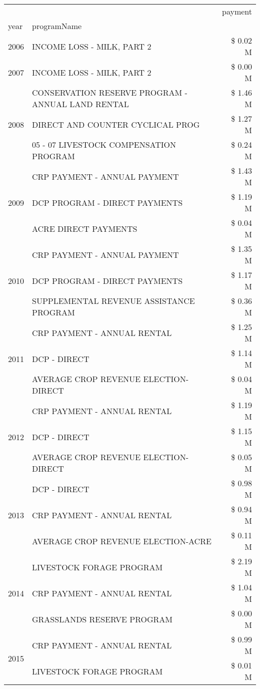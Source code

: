 \begin{tabular}{llr}
\toprule
 &  & payment \\
year & programName &  \\
\midrule
2006 & INCOME LOSS - MILK, PART 2 & \$ 0.02 M \\
\cline{1-3}
2007 & INCOME LOSS - MILK, PART 2 & \$ 0.00 M \\
\cline{1-3}
\multirow[t]{3}{*}{2008} & CONSERVATION RESERVE PROGRAM - ANNUAL LAND RENTAL & \$ 1.46 M \\
 & DIRECT AND COUNTER CYCLICAL PROG & \$ 1.27 M \\
 & 05 - 07 LIVESTOCK COMPENSATION PROGRAM & \$ 0.24 M \\
\cline{1-3}
\multirow[t]{3}{*}{2009} & CRP PAYMENT - ANNUAL PAYMENT & \$ 1.43 M \\
 & DCP PROGRAM - DIRECT PAYMENTS & \$ 1.19 M \\
 & ACRE DIRECT PAYMENTS & \$ 0.04 M \\
\cline{1-3}
\multirow[t]{3}{*}{2010} & CRP PAYMENT - ANNUAL PAYMENT & \$ 1.35 M \\
 & DCP PROGRAM - DIRECT PAYMENTS & \$ 1.17 M \\
 & SUPPLEMENTAL REVENUE ASSISTANCE PROGRAM & \$ 0.36 M \\
\cline{1-3}
\multirow[t]{3}{*}{2011} & CRP PAYMENT - ANNUAL RENTAL & \$ 1.25 M \\
 & DCP - DIRECT & \$ 1.14 M \\
 & AVERAGE CROP REVENUE ELECTION-DIRECT & \$ 0.04 M \\
\cline{1-3}
\multirow[t]{3}{*}{2012} & CRP PAYMENT - ANNUAL RENTAL & \$ 1.19 M \\
 & DCP - DIRECT & \$ 1.15 M \\
 & AVERAGE CROP REVENUE ELECTION-DIRECT & \$ 0.05 M \\
\cline{1-3}
\multirow[t]{3}{*}{2013} & DCP - DIRECT & \$ 0.98 M \\
 & CRP PAYMENT - ANNUAL RENTAL & \$ 0.94 M \\
 & AVERAGE CROP REVENUE ELECTION-ACRE & \$ 0.11 M \\
\cline{1-3}
\multirow[t]{3}{*}{2014} & LIVESTOCK FORAGE PROGRAM & \$ 2.19 M \\
 & CRP PAYMENT - ANNUAL RENTAL & \$ 1.04 M \\
 & GRASSLANDS RESERVE PROGRAM & \$ 0.00 M \\
\cline{1-3}
\multirow[t]{3}{*}{2015} & CRP PAYMENT - ANNUAL RENTAL & \$ 0.99 M \\
 & LIVESTOCK FORAGE PROGRAM & \$ 0.01 M \\

\end{tabular}
